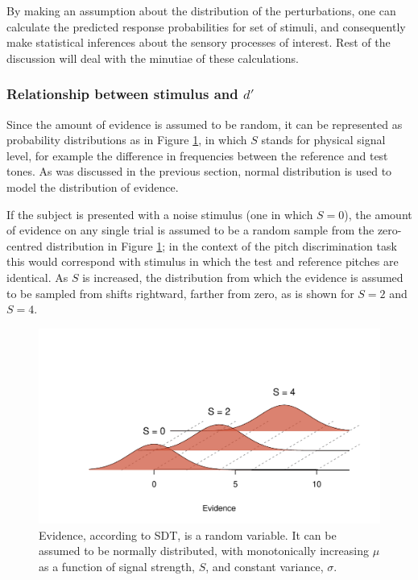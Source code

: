 \documentclass{article}\usepackage{knitr}
\begin{document}
By making an assumption about the distribution of the perturbations, one can calculate the predicted response probabilities for set of stimuli, and consequently make statistical inferences about the sensory processes of interest. Rest of the discussion will deal with the minutiae of these calculations. 

\subsubsection{Relationship between stimulus and $d'$}

Since the amount of evidence is assumed to be random, it can be represented as probability distributions as in Figure \ref{fig:SDT}, in which $S$ stands for physical signal level, for example the difference in frequencies between the reference and test tones. As was discussed in the previous section, normal distribution is used to model the distribution of evidence. 

If the subject is presented with a noise stimulus (one in which $S = 0$), the amount of evidence on any single trial is assumed to be a random sample from the zero-centred distribution in Figure \ref{fig:SDT}; in the context of the pitch discrimination task this would correspond with stimulus in which the test and reference pitches are identical. As $S$ is increased, the distribution from which the evidence is assumed to be sampled from shifts rightward, farther from zero, as is shown for $S = 2$ and $S = 4$.

\begin{figure}[!htb]
\begin{center}
\begin{knitrout}
\color{fgcolor}
\includegraphics[width=\maxwidth]{figure/unnamed-chunk-2-1} 

\end{knitrout}
\end{center}
\caption{Evidence, according to SDT, is a random  variable. It can be assumed to be normally distributed, with monotonically increasing $\mu$ as a function of signal strength, $S$, and constant variance, $\sigma$.}
\label{fig:SDT}
\end{figure}
\end{document}
